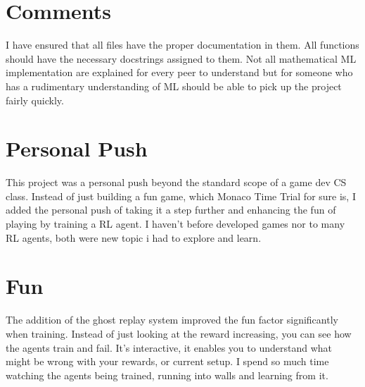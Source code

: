 \documentclass[11pt]{article}
\begin{document}
\section*{Comments}
I have ensured that all files have the proper documentation in them. All functions should have the necessary docstrings assigned to them. Not all mathematical ML implementation are explained for every peer to understand but for someone who has a rudimentary understanding of ML should be able to pick up the project fairly quickly. 

\section*{Personal Push}
This project was a personal push beyond the standard scope of a game dev CS class. Instead of just building a fun game, which Monaco Time Trial for sure is, I added the personal push of taking it a step further and enhancing the fun of playing by training a RL agent. I haven't before developed games nor to many RL agents, both were new topic i had to explore and learn. 

\section*{Fun}
The addition of the ghost replay system improved the fun factor significantly when training. Instead of just looking at the reward increasing, you can see how the agents train and fail. It's interactive, it enables you to understand what might be wrong with your rewards, or current setup. I spend so much time watching the agents being trained, running into walls and learning from it.  
\end{document}

